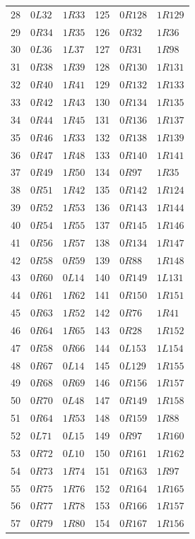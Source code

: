 {\begin{longtable}{rll@{\qquad}rll}
28 & $0L32$ & $1R33$ & 125 & $0R128$ & $1R129$\\
29 & $0R34$ & $1R35$ & 126 & $0R32$ & $1R36$\\
30 & $0L36$ & $1L37$ & 127 & $0R31$ & $1R98$\\
31 & $0R38$ & $1R39$ & 128 & $0R130$ & $1R131$\\
32 & $0R40$ & $1R41$ & 129 & $0R132$ & $1R133$\\
33 & $0R42$ & $1R43$ & 130 & $0R134$ & $1R135$\\
34 & $0R44$ & $1R45$ & 131 & $0R136$ & $1R137$\\
35 & $0R46$ & $1R33$ & 132 & $0R138$ & $1R139$\\
36 & $0R47$ & $1R48$ & 133 & $0R140$ & $1R141$\\
37 & $0R49$ & $1R50$ & 134 & $0R97$ & $1R35$\\
38 & $0R51$ & $1R42$ & 135 & $0R142$ & $1R124$\\
39 & $0R52$ & $1R53$ & 136 & $0R143$ & $1R144$\\
40 & $0R54$ & $1R55$ & 137 & $0R145$ & $1R146$\\
41 & $0R56$ & $1R57$ & 138 & $0R134$ & $1R147$\\
42 & $0R58$ & $0R59$ & 139 & $0R88$ & $1R148$\\
43 & $0R60$ & $0L14$ & 140 & $0R149$ & $1L131$\\
44 & $0R61$ & $1R62$ & 141 & $0R150$ & $1R151$\\
45 & $0R63$ & $1R52$ & 142 & $0R76$ & $1R41$\\
46 & $0R64$ & $1R65$ & 143 & $0R28$ & $1R152$\\
47 & $0R58$ & $0R66$ & 144 & $0L153$ & $1L154$\\
48 & $0R67$ & $0L14$ & 145 & $0L129$ & $1R155$\\
49 & $0R68$ & $0R69$ & 146 & $0R156$ & $1R157$\\
50 & $0R70$ & $0L48$ & 147 & $0R149$ & $1R158$\\
51 & $0R64$ & $1R53$ & 148 & $0R159$ & $1R88$\\
52 & $0L71$ & $0L15$ & 149 & $0R97$ & $1R160$\\
53 & $0R72$ & $0L10$ & 150 & $0R161$ & $1R162$\\
54 & $0R73$ & $1R74$ & 151 & $0R163$ & $1R97$\\
55 & $0R75$ & $1R76$ & 152 & $0R164$ & $1R165$\\
56 & $0R77$ & $1R78$ & 153 & $0R166$ & $1R157$\\
57 & $0R79$ & $1R80$ & 154 & $0R167$ & $1R156$\\

\end{longtable}}
